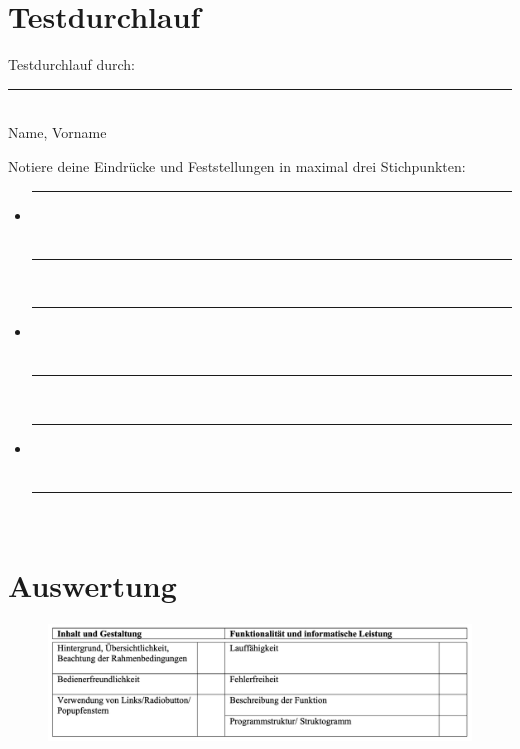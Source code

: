\documentclass[10pt, fleqn]{scrartcl}
\begin{document}

\newpage

\section{Testdurchlauf}

Testdurchlauf durch:
\noindent\null
\rule{11.5cm}{.4pt} \\

\noindent\hspace*{7cm}
Name, Vorname \\
\vspace{1cm}

\noindent\null
Notiere deine Eindrücke und Feststellungen in maximal drei Stichpunkten:

\begin{itemize}
	\item \noindent\null\rule{14cm}{.4pt} \\
		  \vspace{0.1cm} \\
		  \noindent\null\rule{14cm}{.4pt} \\
	\item \noindent\null\rule{14cm}{.4pt} \\
		  \vspace{0.1cm} \\
		  \noindent\null\rule{14cm}{.4pt} \\
	\item \noindent\null\rule{14cm}{.4pt} \\
		  \vspace{0.1cm} \\
		  \noindent\null\rule{14cm}{.4pt} \\
\end{itemize}


\newpage

\section{Auswertung}

\begin{figure}[h!]
	\centering
	\includegraphics[width=\textwidth]{tables/evaluation.png}
	\label{table:evaluation}
\end{figure}
\end{document}
